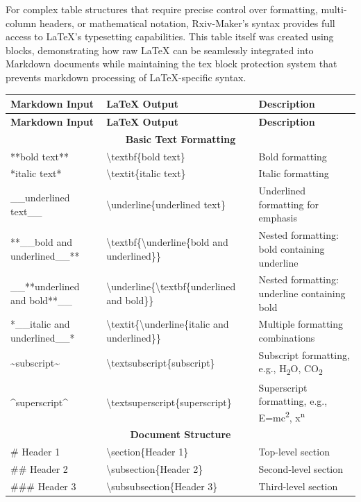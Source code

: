 For complex table structures that require precise control over formatting, multi-column headers, or mathematical notation, Rxiv-Maker's \texttt{} syntax provides full access to LaTeX's typesetting capabilities. This table itself was created using \texttt{} blocks, demonstrating how raw LaTeX can be seamlessly integrated into Markdown documents while maintaining the tex block protection system that prevents markdown processing of LaTeX-specific syntax.

\small
\begin{longtable}{|p{}|p{}|p{}|}
\hline
\textbf{Markdown Input} & \textbf{LaTeX Output} & \textbf{Description} \\
\hline
\endfirsthead
\hline
\textbf{Markdown Input} & \textbf{LaTeX Output} & \textbf{Description} \\
\hline
\endhead

\multicolumn{3}{|c|}{\textbf{Basic Text Formatting}} \\
\hline
**bold text** & \textbackslash textbf\{bold text\} & Bold formatting \\
*italic text* & \textbackslash textit\{italic text\} & Italic formatting \\
\_\_underlined text\_\_ & \textbackslash underline\{underlined text\} & Underlined formatting for emphasis \\
**\_\_bold and underlined\_\_** & \textbackslash textbf\{\textbackslash underline\{bold and underlined\}\} & Nested formatting: bold containing underline \\
\_\_**underlined and bold**\_\_ & \textbackslash underline\{\textbackslash textbf\{underlined and bold\}\} & Nested formatting: underline containing bold \\
*\_\_italic and underlined\_\_* & \textbackslash textit\{\textbackslash underline\{italic and underlined\}\} & Multiple formatting combinations \\
\textasciitilde subscript\textasciitilde & \textbackslash textsubscript\{subscript\} & Subscript formatting, e.g., H\textsubscript{2}O, CO\textsubscript{2} \\
\textasciicircum superscript\textasciicircum & \textbackslash textsuperscript\{superscript\} & Superscript formatting, e.g., E=mc\textsuperscript{2}, x\textsuperscript{n} \\
\hline

\multicolumn{3}{|c|}{\textbf{Document Structure}} \\
\hline
\# Header 1 & \textbackslash section\{Header 1\} & Top-level section \\
\#\# Header 2 & \textbackslash subsection\{Header 2\} & Second-level section \\
\#\#\# Header 3 & \textbackslash subsubsection\{Header 3\} & Third-level section \\
\hline


\end{longtable}

